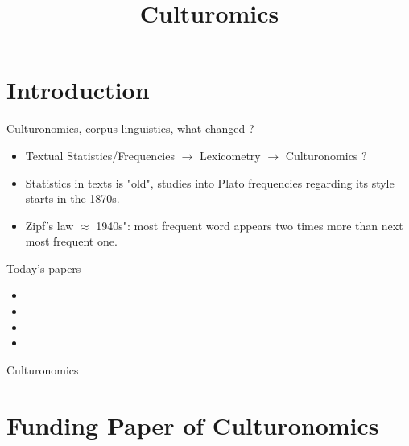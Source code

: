 \documentclass[aspectratio=169]{beamer}
\title[Intro to CH]{Culturomics}
\begin{document}
\frame{\titlepage}


\section{Introduction}

\begin{frame}{Culturonomics, corpus linguistics, what changed ?}
    \begin{itemize}
        \item Textual Statistics/Frequencies $\rightarrow$ Lexicometry $\rightarrow$ Culturonomics ?
        \item Statistics in texts is "old", studies into Plato frequencies regarding its style starts in the 1870s.
        \item Zipf's law $\approx$ 1940s": most frequent word appears two times more than next most frequent one.
    \end{itemize}
\end{frame}

    

\begin{frame}{Today's papers}

    \begin{itemize}
        \item {}
        \item {}
        \item {}
        \item {}
    \end{itemize}
    
\end{frame}

\begin{frame}{Culturonomics}
    
\end{frame}

\section{Funding Paper of Culturonomics}
\end{document}
